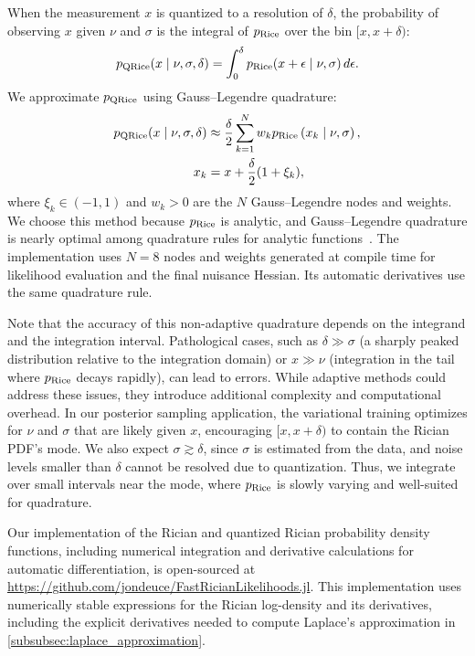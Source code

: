 When the measurement $x$ is quantized to a resolution of $\delta$, the probability of observing $x$ given $\nu$ and $\sigma$ is the integral of $p_{\operatorname{Rice}}$ over the bin $[x, x + \delta)$:
\begin{align}\label{eqn:qrician_pdf}
    p_{\operatorname{QRice}}(x \mid \nu, \sigma, \delta) = \int_{0}^{\delta} p_{\operatorname{Rice}}(x + \epsilon \mid \nu, \sigma) \, d\epsilon.
\end{align}
We approximate $p_{\operatorname{QRice}}$ using Gauss--Legendre quadrature:
\begin{align}\label{eqn:qrician_quadrature}
    p_{\operatorname{QRice}}(x \mid \nu, \sigma, \delta) & \approx \frac{\delta}{2} \sum_{k=1}^{N} w_k p_{\operatorname{Rice}}\left(x_k \mid \nu, \sigma \right), \\
    x_k                                    & = x + \frac{\delta}{2}(1 + \xi_k), \nonumber
\end{align}
where $\xi_k \in (-1, 1)$ and $w_k > 0$ are the $N$ Gauss--Legendre nodes and weights.
We choose this method because $p_{\operatorname{Rice}}$ is analytic, and Gauss--Legendre quadrature is nearly optimal among quadrature rules for analytic functions~\citep{kowalski_is_1985,chawla_error_1968}.
The implementation uses $N = 8$ nodes and weights generated at compile time for likelihood evaluation and the final nuisance Hessian. Its automatic derivatives use the same quadrature rule.

Note that the accuracy of this non-adaptive quadrature depends on the integrand and the integration interval.
Pathological cases, such as $\delta \gg \sigma$ (a sharply peaked distribution relative to the integration domain) or $x \gg \nu$ (integration in the tail where $p_{\operatorname{Rice}}$ decays rapidly), can lead to errors.
While adaptive methods could address these issues, they introduce additional complexity and computational overhead.
In our posterior sampling application, the variational training optimizes for $\nu$ and $\sigma$ that are likely given $x$, encouraging $[x, x + \delta)$ to contain the Rician \gls*{PDF}'s mode.
We also expect $\sigma \gtrsim \delta$, since $\sigma$ is estimated from the data, and noise levels smaller than $\delta$ cannot be resolved due to quantization.
Thus, we integrate over small intervals near the mode, where $p_{\operatorname{Rice}}$ is slowly varying and well-suited for quadrature.

Our implementation of the Rician and quantized Rician probability density functions, including numerical integration and derivative calculations for automatic differentiation, is open-sourced at \url{https://github.com/jondeuce/FastRicianLikelihoods.jl}.
This implementation uses numerically stable expressions for the Rician log-density and its derivatives, including the explicit derivatives needed to compute Laplace's approximation in \cref{subsubsec:laplace_approximation}.


